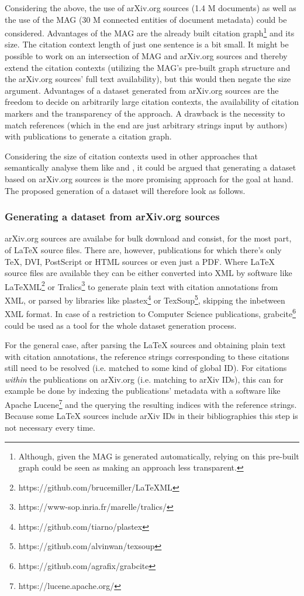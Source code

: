 \documentclass{proseminar}
\begin{document}
Considering the above, the use of arXiv.org sources (1.4 M documents) as well as the use of the MAG (30 M connected entities of document metadata) could be considered. Advantages of the MAG are the already built citation graph\footnote{Although, given the MAG is generated automatically, relying on this pre-built graph could be seen as making an approach less transparent.} and its size. The citation context length of just one sentence is a bit small. It might be possible to work on an intersection of MAG and arXiv.org sources and thereby extend the citation contexts (utilizing the MAG's pre-built graph structure and the arXiv.org sources' full text availability), but this would then negate the size argument. Advantages of a dataset generated from arXiv.org sources are the freedom to decide on arbitrarily large citation contexts, the availability of citation markers and the transparency of the approach. A drawback is the necessity to match references (which in the end are just arbitrary strings input by authors) with publications to generate a citation graph.

Considering the size of citation contexts used in other approaches that semantically analyse them like \cite{Duma2016} and \cite{Kobayashi2018}, it could be argued that generating a dataset based on arXiv.org sources is the more promising approach for the goal at hand. The proposed generation of a dataset will therefore look as follows.

\subsubsection{Generating a dataset from arXiv.org sources}
arXiv.org sources are availabe for bulk download and consist, for the most part, of LaTeX source files. There are, however, publications for which there's only TeX, DVI, PostScript or HTML sources or even just a PDF. Where LaTeX source files are available they can be either converted into XML by software like LaTeXML\footnote{https://github.com/brucemiller/LaTeXML} or Tralics\footnote{https://www-sop.inria.fr/marelle/tralics/} to generate plain text with citation annotations from XML, or parsed by libraries like plastex\footnote{https://github.com/tiarno/plastex} or TexSoup\footnote{https://github.com/alvinwan/texsoup}, skipping the inbetween XML format. In case of a restriction to Computer Science publications, grabcite\footnote{https://github.com/agrafix/grabcite} could be used as a tool for the whole dataset generation process.

For the general case, after parsing the LaTeX sources and obtaining plain text with citation annotations, the reference strings corresponding to these citations still need to be resolved (i.e. matched to some kind of global ID). For citations \emph{within} the publications on arXiv.org (i.e. matching to arXiv IDs), this can for example be done by indexing the publications' metadata with a software like Apache Lucene\footnote{https://lucene.apache.org/} and the querying the resulting indices with the reference strings. Because some LaTeX sources include arXiv IDs in their bibliographies this step is not necessary every time.
\end{document}
